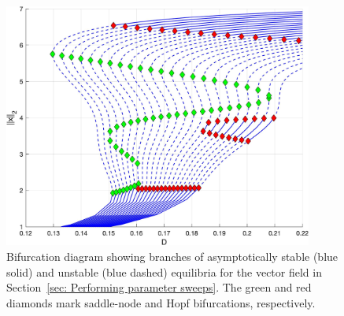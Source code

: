 \begin{figure}[h]
\centering
\includegraphics[width=4in]{Figures/Section3_5_1.jpg}
\caption{Bifurcation diagram showing branches of asymptotically stable (blue solid) and unstable (blue dashed) equilibria for the vector field in Section~\ref{sec: Performing parameter sweeps}. The green and red diamonds mark saddle-node and Hopf bifurcations, respectively.}
\label{fig: Section3_5_1}
\end{figure}

